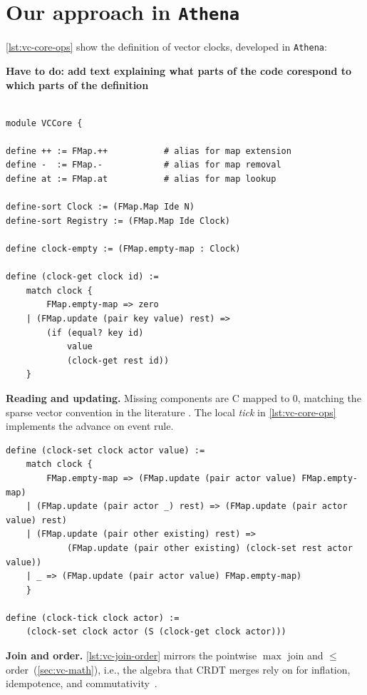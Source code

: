 \section{Our approach in \texttt{Athena}}\label{sec:vc-code}

\ref{lst:vc-core-ops} show the definition of vector clocks, developed in \texttt{Athena}:

\textbf{Have to do: add text explaining what parts of the code corespond to which parts of the definition}

\begin{lstlisting}

module VCCore {

define ++ := FMap.++           # alias for map extension
define -  := FMap.-            # alias for map removal
define at := FMap.at           # alias for map lookup

define-sort Clock := (FMap.Map Ide N)
define-sort Registry := (FMap.Map Ide Clock)

define clock-empty := (FMap.empty-map : Clock)

define (clock-get clock id) :=
    match clock {
        FMap.empty-map => zero
    | (FMap.update (pair key value) rest) =>
        (if (equal? key id)
            value
            (clock-get rest id))
    }
\end{lstlisting}

\noindent\textbf{Reading and updating.} Missing components are C mapped to $0$, matching the sparse vector convention in the literature \cite{fidge1988timestamps,mattern1989virtual}. The local \emph{tick} in \ref{lst:vc-core-ops} implements the advance on event rule.


\begin{lstlisting}
define (clock-set clock actor value) :=
    match clock {
        FMap.empty-map => (FMap.update (pair actor value) FMap.empty-map)
    | (FMap.update (pair actor _) rest) => (FMap.update (pair actor value) rest)
    | (FMap.update (pair other existing) rest) =>
            (FMap.update (pair other existing) (clock-set rest actor value))
    | _ => (FMap.update (pair actor value) FMap.empty-map)
    }

define (clock-tick clock actor) :=
    (clock-set clock actor (S (clock-get clock actor)))
\end{lstlisting}

\noindent\textbf{Join and order.} \ref{lst:vc-join-order} mirrors the pointwise $\max$ join and $\le$ order~(\ref{sec:vc-math}), i.e., the algebra that CRDT merges rely on for inflation, idempotence, and commutativity~\cite{shapiro2011conflict}.



